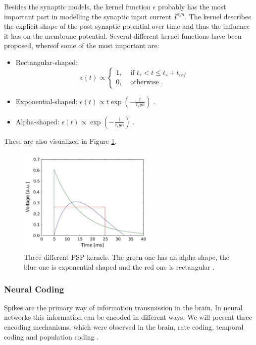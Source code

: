 Besides the synaptic models, the kernel function $\epsilon$ probably has the most important part in modelling the synaptic input current $I^{syn}$. 
The kernel describes the explicit shape of the post synaptic potential over time and thus the influence it has on the membrane potential.
Several different kernel functions have been proposed, whereof some of the most important are:
\begin{itemize}
\item Rectangular-shaped: \[\epsilon(t) \propto  \begin{cases} 1, & \text{ if } t_{s} < t \le t_{s} + t_{ref} \\ 0, & \text{ otherwise .} \end{cases} \] 
\item Exponential-shaped: $\epsilon(t) \propto t \exp(- \frac{t}{\tau_syn})$ .
\item Alpha-shaped: $\epsilon(t) \propto \exp(- \frac{t}{\tau_syn})$ .
\end{itemize}

These are also visualized in Figure \ref{fig:pspkernels}.

\begin{figure}
	\centering
    	\includegraphics[width=0.6\textwidth]{imgs/psp_kernel.png} 
    \caption[PSP kernels.]{Three different PSP kernels. The green one has an alpha-shape, the blue one is exponential shaped and the red one is rectangular \cite{Petrovici2016}. }
	\label{fig:pspkernels}
\end{figure}

\subsubsection{Neural Coding} \label{c:neuralcoding}

Spikes are the primary way of information transmission in the brain.
In neural networks this information can be encoded in different ways.
We will present three encoding mechanisms, which were observed in the brain, rate coding, temporal coding and population coding \cite{Meftah2013}.

